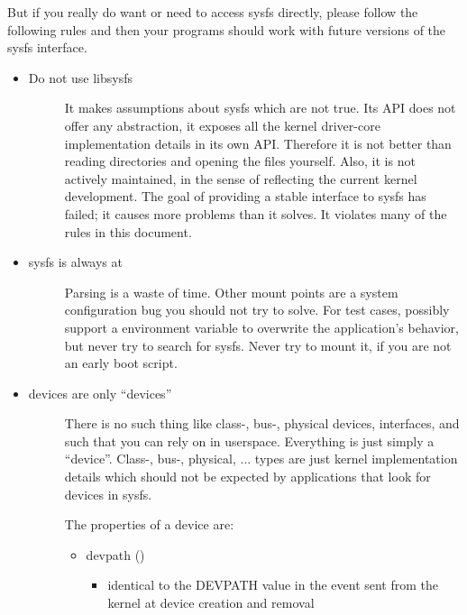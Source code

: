 \documentclass[a4paper,8pt,english]{sphinxmanual}
\begin{document}
But if you really do want or need to access sysfs directly, please follow
the following rules and then your programs should work with future
versions of the sysfs interface.
\begin{itemize}
\item {} \begin{description}
\item[{Do not use libsysfs}] \leavevmode
It makes assumptions about sysfs which are not true. Its API does not
offer any abstraction, it exposes all the kernel driver-core
implementation details in its own API. Therefore it is not better than
reading directories and opening the files yourself.
Also, it is not actively maintained, in the sense of reflecting the
current kernel development. The goal of providing a stable interface
to sysfs has failed; it causes more problems than it solves. It
violates many of the rules in this document.

\end{description}

\item {} \begin{description}
\item[{sysfs is always at }] \leavevmode
Parsing  is a waste of time. Other mount points are a
system configuration bug you should not try to solve. For test cases,
possibly support a  environment variable to overwrite the
application's behavior, but never try to search for sysfs. Never try
to mount it, if you are not an early boot script.

\end{description}

\item {} \begin{description}
\item[{devices are only ``devices''}] \leavevmode
There is no such thing like class-, bus-, physical devices,
interfaces, and such that you can rely on in userspace. Everything is
just simply a ``device''. Class-, bus-, physical, ... types are just
kernel implementation details which should not be expected by
applications that look for devices in sysfs.

The properties of a device are:
\begin{itemize}
\item {} 
devpath ()
\begin{itemize}
\item {} 
identical to the DEVPATH value in the event sent from the kernel
at device creation and removal


\end{itemize}
\end{itemize}
\end{description}
\end{itemize}
\end{document}
